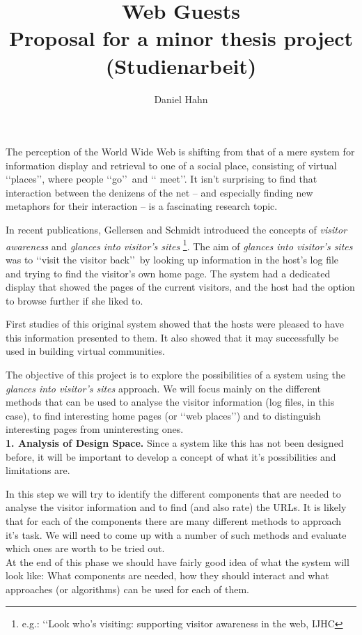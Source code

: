 \documentclass[a4paper]{danarticle}
\begin{document}
  \author{Daniel Hahn}
  \title{Web Guests\\ Proposal for a minor thesis project\\ (Studienarbeit)}
  \maketitle
    The perception of the World Wide Web is shifting from that of a mere system
    for information display and retrieval to one of a social place, consisting
    of virtual \lq\lq places\rq\rq , where people \lq\lq go\rq\rq\ and \lq\lq
    meet\rq\rq . It isn't surprising to find that interaction between the denizens
    of the net -- and especially finding new metaphors for their interaction --
    is a fascinating research topic.
    
    In recent publications, Gellersen and Schmidt introduced the concepts of
    \textit{visitor awareness} and \textit{glances into visitor's sites}
    \footnote{e.g.: \lq\lq Look who's visiting: supporting visitor awareness in 
    the web, IJHC}. 
    The aim of \textit{glances into visitor's sites} 
    was to \lq\lq visit the visitor back\rq\rq\ by looking up
    information in the host's log file and trying to find the visitor's own
    home page. The system had a dedicated display that showed the pages of the
    current visitors, and the host had the option to browse further if she liked
    to.
    
    First studies of this original system showed that the hosts were pleased to
    have this information presented to them. It also showed that it may
    successfully be used in building virtual communities.
    
    The objective of this project is to explore the possibilities of a system
    using the \textit{glances into visitor's sites} approach. We will focus
    mainly on the different methods that can be used to analyse the visitor
    information (log files, in this case), to find interesting home pages (or
    \lq\lq web places\rq\rq ) and to distinguish interesting pages from
    uninteresting ones. 
    \\
    
    \textbf{1. Analysis of Design Space.} Since a system like this
    has not been designed before, it will be important to 
    develop a concept of what it's possibilities and limitations are.
    
    In this step we will try to identify the different components that are
    needed to analyse the visitor information and to find (and  also rate) the
    URLs. It is likely that for each of the components there are many different
    methods to approach it's task. We will need to come up with a number of such
    methods and evaluate which ones are worth to be tried out.
    \\
    At the end of this phase we should have fairly good idea of what the system
    will look like: What components are needed, how they should interact and
    what approaches (or algorithms) can be used for each of them.
    \\
    
\end{document}
